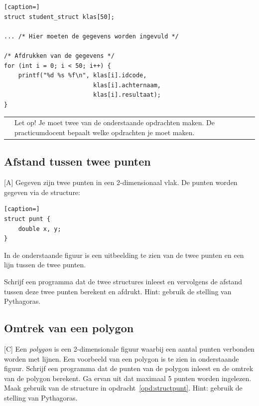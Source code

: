 \documentclass[a4paper,10pt,fleqn,twoside]{article}
\newcommand{\letop}{%
\vspace{4ex plus 1ex minus 1ex}
\begin{mdframed}[outerlinewidth = 1 ,%
roundcorner = 4 pt,%
leftmargin = 40,%
rightmargin = 40,%
backgroundcolor = yellow!40,%
outerlinecolor = red!70!black,%
innertopmargin = \topskip,%
splittopskip = \topskip,%
]
\begin{tabularx}{\linewidth}{m{1cm}X}
\Large\leftpointright & Let op! Je moet twee van de onderstaande opdrachten maken. De practicumdocent bepaalt welke opdrachten je moet maken.
\end{tabularx}
\end{mdframed}
\vspace{4ex plus 1ex minus 1ex}
}
\begin{document}
\begin{lstlisting}[caption=]
struct student_struct klas[50];

... /* Hier moeten de gegevens worden ingevuld */

/* Afdrukken van de gegevens */
for (int i = 0; i < 50; i++) {
    printf("%d %s %f\n", klas[i].idcode,
                         klas[i].achternaam,
                         klas[i].resultaat);
}
\end{lstlisting}

\letop
\clearpage

\subsection{Afstand tussen twee punten}[A]
\label{opd:structpunt}
Gegeven zijn twee punten in een 2-dimensionaal vlak. De punten worden gegeven via de structure:

\begin{lstlisting}[caption=]
struct punt {
    double x, y;
}
\end{lstlisting}

In de onderstaande figuur is een uitbeelding te zien van de twee punten en een lijn tussen de twee punten.

\begin{figure}[H]
\centering
{}
\end{figure}

Schrijf een programma dat de twee structures inleest en vervolgens de afstand tussen deze twee punten berekent en afdrukt. Hint: gebruik de stelling van Pythagoras.


\subsection{Omtrek van een polygon}[C]
Een \textsl{polygon} is een 2-dimensionale figuur waarbij een aantal punten verbonden worden met lijnen. Een voorbeeld van een polygon is te zien in onderstaande figuur. Schrijf een programma dat de punten van de polygon inleest en de omtrek van de polygon berekent. Ga ervan uit dat maximaal 5 punten worden ingelezen. Maak gebruik van de structure in opdracht~\ref{opd:structpunt}. Hint: gebruik de stelling van Pythagoras.
\end{document}
